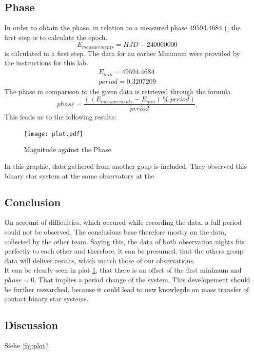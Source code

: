 \subsection{Phase}
  \label{sec:again}
  In order to obtain the phase, in relation to a measured phase $49594.4684$ (, the first step is to calculate the epoch.
  \begin{equation*}
    E_{measurements} = HJD - 240000000
  \end{equation*}
  is calculated in a first step. The data for an earlier Minimum were provided by the 
  instructions for this lab. 
  \begin{align*}
    E_{min} = 49594.4684\\
    period = 0.3207209
  \end{align*}
  The phase in comparison to the given data is retrieved through the formula
  \begin{equation}
    phase = \dfrac{((E_{measurements}-E_{min})\ \% \ period)}{period}.
  \end{equation}
  This leads us to the following results:
  \begin{figure}[H]
    \centering
    \texttt{[image: plot.pdf]}
    \caption{Magnitude against the Phase}
    \label{fig:phase}
  \end{figure}
  In this graphic, data gathered from another goup is included. %
  They observed this binary star system at the same observatory at the %

\subsection{Conclusion}
  \label{sec:fuckoff}
  On account of difficulties, which occured while recording the data, a full period could not
  be observed. The conclusions base therefore mostly on the data, collected by the other team.
  Saying this, the data of both observation nights fits perfectly to each other and therefore, 
  it can be presumed, that the others group data will deliver results, which match those of our 
  observations.\\
  It can be clearly seen in plot \ref{fig:phase}, that there is an offset of the first minimum 
  and $phase = 0$. That implies a period change of the system. This developement should be 
  further researched, because it could lead to new knowlegde on mass transfer of contact binary
  star systems.

\subsection{Discussion}
  \label{sec:orange}




Siehe \autoref{fig:plot}!
